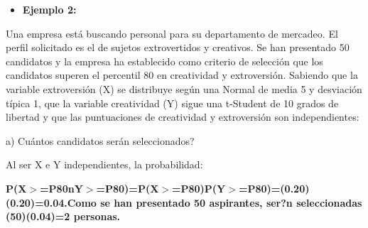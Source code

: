 \documentclass[12pt,letterpaper]{article}\usepackage[]{graphicx}\usepackage[]{color}
\begin{document}
\begin{itemize}
  \item \textbf{Ejemplo 2:}
\end{itemize}

Una empresa est\'a buscando personal para su departamento de mercadeo. El perfil solicitado es el de sujetos extrovertidos y creativos. Se han presentado 50 candidatos y la empresa ha establecido como criterio de selecci\'on que los candidatos superen el percentil 80 en creatividad y extroversi\'on. Sabiendo que la variable extroversi\'on (X) se distribuye seg\'un una Normal de media 5 y desviaci\'on t\'ipica 1, que la variable creatividad (Y) sigue una t-Student de 10 grados de libertad y que las puntuaciones de creatividad y extroversi\'on son independientes: 
\begin{description}
  \item a) Cu\'antos candidatos ser\'an seleccionados?
  
Al ser X e Y independientes, la probabilidad:

\textbf{P(X$>$=P80nY$>$=P80)=P(X$>$=P80)P(Y$>$=P80)=(0.20)(0.20)=0.04.Como se han presentado 50 aspirantes, ser?n seleccionadas (50)(0.04)=2 personas.}

\end{description}
\end{document}
